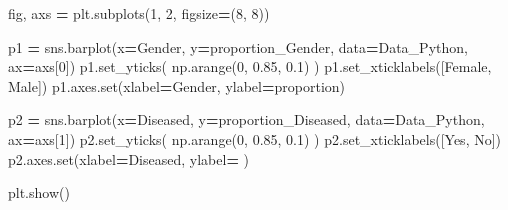 \documentclass[
  11pt,
  a4paper,
]{article}
\newenvironment{Shaded}{\begin{snugshade}}{\end{snugshade}}
\newcommand{\BuiltInTok}[1]{#1}
\newcommand{\DecValTok}[1]{\textcolor[rgb]{0.00,0.00,0.81}{#1}}
\newcommand{\FloatTok}[1]{\textcolor[rgb]{0.00,0.00,0.81}{#1}}
\newcommand{\NormalTok}[1]{#1}
\newcommand{\OperatorTok}[1]{\textcolor[rgb]{0.81,0.36,0.00}{\textbf{#1}}}
\newcommand{\StringTok}[1]{\textcolor[rgb]{0.31,0.60,0.02}{#1}}
\begin{document}
\begin{Shaded}
\begin{Highlighting}[]
\NormalTok{fig, axs }\OperatorTok{=}\NormalTok{ plt.subplots(}\DecValTok{1}\NormalTok{, }\DecValTok{2}\NormalTok{, figsize}\OperatorTok{=}\NormalTok{(}\DecValTok{8}\NormalTok{, }\DecValTok{8}\NormalTok{))}

\NormalTok{p1 }\OperatorTok{=}\NormalTok{ sns.barplot(x}\OperatorTok{=}\StringTok{\textquotesingle{}Gender\textquotesingle{}}\NormalTok{, y}\OperatorTok{=}\StringTok{\textquotesingle{}proportion\_Gender\textquotesingle{}}\NormalTok{, data}\OperatorTok{=}\NormalTok{Data\_Python, ax}\OperatorTok{=}\NormalTok{axs[}\DecValTok{0}\NormalTok{]) }
\NormalTok{p1.set\_yticks( np.arange(}\DecValTok{0}\NormalTok{, }\FloatTok{0.85}\NormalTok{, }\FloatTok{0.1}\NormalTok{)  )}
\NormalTok{p1.set\_xticklabels([}\StringTok{\textquotesingle{}Female\textquotesingle{}}\NormalTok{, }\StringTok{\textquotesingle{}Male\textquotesingle{}}\NormalTok{])}
\NormalTok{p1.axes.}\BuiltInTok{set}\NormalTok{(xlabel}\OperatorTok{=}\StringTok{\textquotesingle{}Gender\textquotesingle{}}\NormalTok{, ylabel}\OperatorTok{=}\StringTok{\textquotesingle{}proportion\textquotesingle{}}\NormalTok{)}

\NormalTok{p2 }\OperatorTok{=}\NormalTok{ sns.barplot(x}\OperatorTok{=}\StringTok{\textquotesingle{}Diseased\textquotesingle{}}\NormalTok{, y}\OperatorTok{=}\StringTok{\textquotesingle{}proportion\_Diseased\textquotesingle{}}\NormalTok{, data}\OperatorTok{=}\NormalTok{Data\_Python, ax}\OperatorTok{=}\NormalTok{axs[}\DecValTok{1}\NormalTok{]) }
\NormalTok{p2.set\_yticks( np.arange(}\DecValTok{0}\NormalTok{, }\FloatTok{0.85}\NormalTok{, }\FloatTok{0.1}\NormalTok{)  )}
\NormalTok{p2.set\_xticklabels([}\StringTok{\textquotesingle{}Yes\textquotesingle{}}\NormalTok{, }\StringTok{\textquotesingle{}No\textquotesingle{}}\NormalTok{])}
\NormalTok{p2.axes.}\BuiltInTok{set}\NormalTok{(xlabel}\OperatorTok{=}\StringTok{\textquotesingle{}Diseased\textquotesingle{}}\NormalTok{, ylabel}\OperatorTok{=}\StringTok{\textquotesingle{} \textquotesingle{}}\NormalTok{)}

\NormalTok{plt.show()}
\end{Highlighting}
\end{Shaded}
\end{document}
